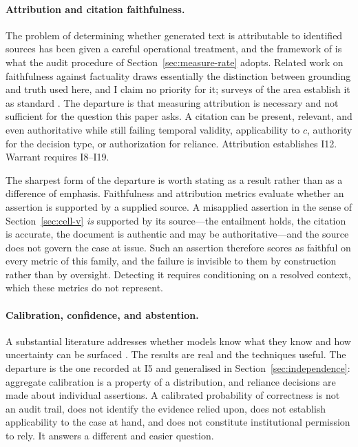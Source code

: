\documentclass[11pt]{article}
\theoremstyle{plain}
\theoremstyle{definition}
\begin{document}
\paragraph{Attribution and citation faithfulness.} The problem of determining
whether generated text is attributable to identified sources has been given a
careful operational treatment, and the framework of \citet{rashkin2023} is what the
audit procedure of Section~\ref{sec:measure-rate} adopts. Related work on
faithfulness against factuality \citep{maynez2020} draws essentially the
distinction between grounding and truth used here, and I claim no priority for it;
surveys of the area establish it as standard \citep{ji2023}. The departure is
that measuring attribution is necessary and not sufficient for the question this
paper asks. A citation can be present, relevant, and even authoritative while still
failing temporal validity, applicability to $c$, authority for the decision type, or
authorization for reliance. Attribution establishes I12. Warrant requires I8--I19.

The sharpest form of the departure is worth stating as a result rather than as a
difference of emphasis. Faithfulness and attribution metrics evaluate whether an
assertion is supported by a supplied source. A misapplied assertion in the sense of
Section~\ref{sec:cell-v} \emph{is} supported by its source---the entailment holds,
the citation is accurate, the document is authentic and may be authoritative---and
the source does not govern the case at issue. Such an assertion therefore scores as
faithful on every metric of this family, and the failure is invisible to them by
construction rather than by oversight. Detecting it requires conditioning on a
resolved context, which these metrics do not represent.

\paragraph{Calibration, confidence, and abstention.} A substantial literature
addresses whether models know what they know and how uncertainty can be surfaced
\citep{kadavath2022,lin2022}. The results are real and the techniques useful. The
departure is the one recorded at I5 and generalised in
Section~\ref{sec:independence}: aggregate calibration is a property of a
distribution, and reliance decisions are made about individual assertions. A
calibrated probability of correctness is not an audit trail, does not identify the
evidence relied upon, does not establish applicability to the case at hand, and does
not constitute institutional permission to rely. It answers a different and easier
question.
\end{document}

